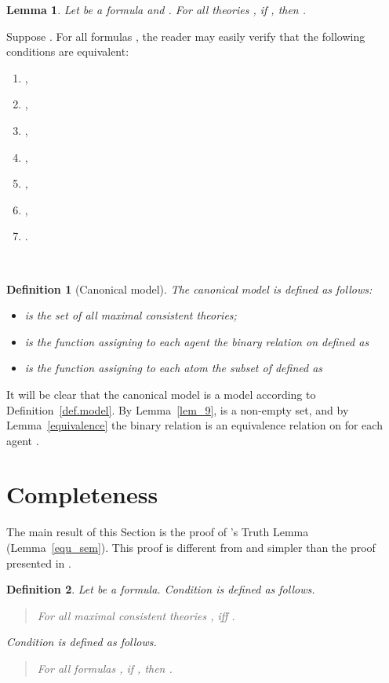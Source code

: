 \documentclass{article}[12pt]
\newtheorem{lemma}{Lemma}
\newenvironment{proof}{\noindent {\bf Proof \ }}{\hfill ~}
\newtheorem{definition}{Definition}
\begin{document}
\begin{lemma}\label{commutatif}
Let  be a formula and .
For all theories , if , then .
\end{lemma}
\begin{proof}
Suppose .
For all formulas , the reader may easily verify that the following conditions are equivalent:
\begin{enumerate}
\item ,
\item ,
\item ,
\item ,
\item ,
\item ,
\item .
\end{enumerate}
\end{proof}
\begin{definition}[Canonical model]
The {\em canonical model}  is defined as follows:
\begin{itemize}
\item  is the set of all maximal consistent theories;
\item  is the function assigning to each agent  the binary relation  on  defined as 
\item  is the function assigning to each atom  the subset  of  defined as 
\end{itemize}
\end{definition}
It will be clear that the canonical model is a model according to Definition~\ref{def.model}.  By Lemma~\ref{lem_9},  is a non-empty set, and by Lemma~\ref{equivalence} the binary relation  is an equivalence relation on  for each agent .
\section{Completeness}
The main result of this Section is the proof of 's Truth Lemma (Lemma~\ref{equ_sem}).
This proof is different from and simpler than the proof presented in \cite{balbianietal:2008}.

\begin{definition}
Let  be a formula. Condition  is defined as follows.  \begin{quote} For all maximal consistent theories ,   iff . \end{quote}
Condition  is defined as follows. \begin{quote} For all formulas , if , then . \end{quote}
\end{definition}
\end{document}
